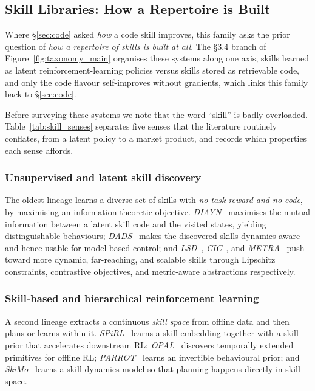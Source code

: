\subsection{Skill Libraries: How a Repertoire is Built}
\label{sec:skill}

Where \S\ref{sec:code} asked \emph{how} a code skill improves, this family asks the prior
question of \emph{how a repertoire of skills is built at all}. The \S3.4 branch of
Figure~\ref{fig:taxonomy_main} organises these systems along one axis, skills learned as latent reinforcement-learning policies
versus skills stored as retrievable code, and only the code flavour self-improves without
gradients, which links this family back to \S\ref{sec:code}.

Before surveying these systems we note that the word ``skill'' is badly overloaded.
Table~\ref{tab:skill_senses} separates five senses that the literature routinely conflates,
from a latent policy to a market product, and records which properties each sense affords.



\subsubsection{Unsupervised and latent skill discovery}
The oldest lineage learns a diverse set of skills with \emph{no task reward and no code}, by
maximising an information-theoretic objective. \emph{DIAYN}~\citep{diayn} maximises the mutual
information between a latent skill code and the visited states, yielding distinguishable
behaviours; \emph{DADS}~\citep{dads} makes the discovered skills dynamics-aware and hence
usable for model-based control; and \emph{LSD}~\citep{lsd}, \emph{CIC}~\citep{cic}, and
\emph{METRA}~\citep{metra} push toward more dynamic, far-reaching, and scalable skills through
Lipschitz constraints, contrastive objectives, and metric-aware abstractions respectively.

\subsubsection{Skill-based and hierarchical reinforcement learning}
A second lineage extracts a continuous \emph{skill space} from offline data and then plans or
learns within it. \emph{SPiRL}~\citep{spirl} learns a skill embedding together with a skill
prior that accelerates downstream RL; \emph{OPAL}~\citep{opal} discovers temporally extended
primitives for offline RL; \emph{PARROT}~\citep{parrot} learns an invertible behavioural
prior; and \emph{SkiMo}~\citep{skimo} learns a skill dynamics model so that planning happens
directly in skill space.

